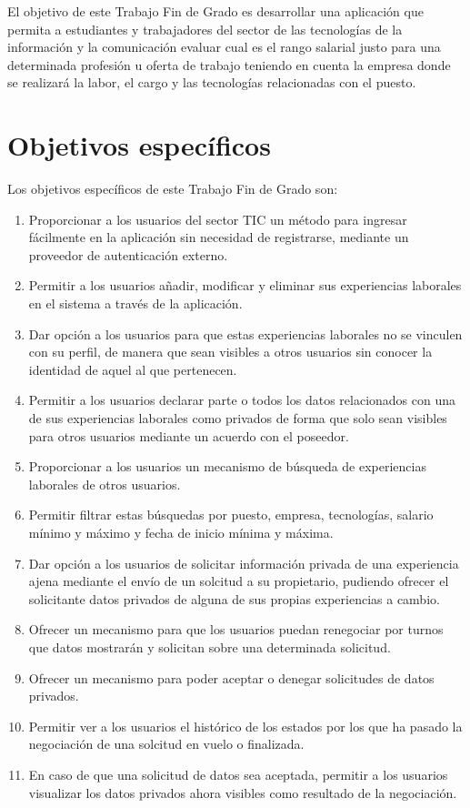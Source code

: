 \documentclass[a4paper, 12pt]{book}
\begin{document}
El objetivo de este Trabajo Fin de Grado es desarrollar una aplicación que permita a estudiantes y trabajadores del sector de las tecnologías de la información y la comunicación evaluar cual es el rango salarial justo para una determinada profesión u oferta de trabajo teniendo en cuenta la empresa donde se realizará la labor, el cargo y las tecnologías relacionadas con el puesto.


\section{Objetivos específicos}
\label{sec:target_specifictargets}

Los objetivos específicos de este Trabajo Fin de Grado son:

\begin{enumerate}
  \item Proporcionar a los usuarios del sector TIC un método para ingresar fácilmente en la aplicación sin necesidad de registrarse, mediante un proveedor de autenticación externo.
  \item Permitir a los usuarios añadir, modificar y eliminar sus experiencias laborales en el sistema a través de la aplicación.
  \item Dar opción a los usuarios para que estas experiencias laborales no se vinculen con su perfil, de manera que sean visibles a otros usuarios sin conocer la identidad de aquel al que pertenecen.
  \item Permitir a los usuarios declarar parte o todos los datos relacionados con una de sus experiencias laborales como privados de forma que solo sean visibles para otros usuarios mediante un acuerdo con el poseedor.
  \item Proporcionar a los usuarios un mecanismo de búsqueda de experiencias laborales de otros usuarios.
  \item Permitir filtrar estas búsquedas por puesto, empresa, tecnologías, salario mínimo y máximo y fecha de inicio mínima y máxima.
  \item Dar opción a los usuarios de solicitar información privada de una experiencia ajena mediante el envío de un solcitud a su propietario, pudiendo ofrecer el solicitante datos privados de alguna de sus propias experiencias a cambio.
  \item Ofrecer un mecanismo para que los usuarios puedan renegociar por turnos que datos mostrarán y solicitan sobre una determinada solicitud.
  \item Ofrecer un mecanismo para poder aceptar o denegar solicitudes de datos privados.
  \item Permitir ver a los usuarios el histórico de los estados por los que ha pasado la negociación de una solcitud en vuelo o finalizada.
  \item En caso de que una solicitud de datos sea aceptada, permitir a los usuarios visualizar los datos privados ahora visibles como resultado de la negociación.
\end{enumerate}
\end{document}

